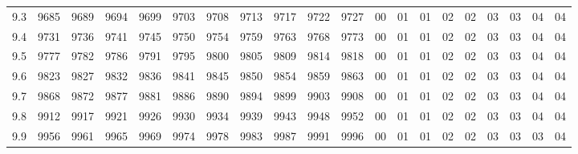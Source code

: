 \documentclass[12pt,UTF8]{ctexbook}
\begin{document}
\begin{appendix}
\begin{longtable}{|c| c c c c c | c c c c c| c c c c c c c c c|}
\scriptsize 9.3 & \scriptsize 9685 & \scriptsize 9689 & \scriptsize 9694 & \scriptsize 9699 & \scriptsize 9703 & \scriptsize 9708 & \scriptsize 9713 & \scriptsize 9717 & \scriptsize 9722 & \scriptsize 9727 & \scriptsize 00 & \scriptsize 01 & \scriptsize 01 & \scriptsize 02 & \scriptsize 02 & \scriptsize 03 & \scriptsize 03 & \scriptsize 04 & \scriptsize 04 \\
\scriptsize 9.4 & \scriptsize 9731 & \scriptsize 9736 & \scriptsize 9741 & \scriptsize 9745 & \scriptsize 9750 & \scriptsize 9754 & \scriptsize 9759 & \scriptsize 9763 & \scriptsize 9768 & \scriptsize 9773 & \scriptsize 00 & \scriptsize 01 & \scriptsize 01 & \scriptsize 02 & \scriptsize 02 & \scriptsize 03 & \scriptsize 03 & \scriptsize 04 & \scriptsize 04 \\
\scriptsize 9.5 & \scriptsize 9777 & \scriptsize 9782 & \scriptsize 9786 & \scriptsize 9791 & \scriptsize 9795 & \scriptsize 9800 & \scriptsize 9805 & \scriptsize 9809 & \scriptsize 9814 & \scriptsize 9818 & \scriptsize 00 & \scriptsize 01 & \scriptsize 01 & \scriptsize 02 & \scriptsize 02 & \scriptsize 03 & \scriptsize 03 & \scriptsize 04 & \scriptsize 04 \\
\scriptsize 9.6 & \scriptsize 9823 & \scriptsize 9827 & \scriptsize 9832 & \scriptsize 9836 & \scriptsize 9841 & \scriptsize 9845 & \scriptsize 9850 & \scriptsize 9854 & \scriptsize 9859 & \scriptsize 9863 & \scriptsize 00 & \scriptsize 01 & \scriptsize 01 & \scriptsize 02 & \scriptsize 02 & \scriptsize 03 & \scriptsize 03 & \scriptsize 04 & \scriptsize 04 \\
\scriptsize 9.7 & \scriptsize 9868 & \scriptsize 9872 & \scriptsize 9877 & \scriptsize 9881 & \scriptsize 9886 & \scriptsize 9890 & \scriptsize 9894 & \scriptsize 9899 & \scriptsize 9903 & \scriptsize 9908 & \scriptsize 00 & \scriptsize 01 & \scriptsize 01 & \scriptsize 02 & \scriptsize 02 & \scriptsize 03 & \scriptsize 03 & \scriptsize 04 & \scriptsize 04 \\
\scriptsize 9.8 & \scriptsize 9912 & \scriptsize 9917 & \scriptsize 9921 & \scriptsize 9926 & \scriptsize 9930 & \scriptsize 9934 & \scriptsize 9939 & \scriptsize 9943 & \scriptsize 9948 & \scriptsize 9952 & \scriptsize 00 & \scriptsize 01 & \scriptsize 01 & \scriptsize 02 & \scriptsize 02 & \scriptsize 03 & \scriptsize 03 & \scriptsize 04 & \scriptsize 04 \\
\scriptsize 9.9 & \scriptsize 9956 & \scriptsize 9961 & \scriptsize 9965 & \scriptsize 9969 & \scriptsize 9974 & \scriptsize 9978 & \scriptsize 9983 & \scriptsize 9987 & \scriptsize 9991 & \scriptsize 9996 & \scriptsize 00 & \scriptsize 01 & \scriptsize 01 & \scriptsize 02 & \scriptsize 02 & \scriptsize 03 & \scriptsize 03 & \scriptsize 03 & \scriptsize 04 \\
\hline
\end{longtable}


\end{appendix}
\end{document}
